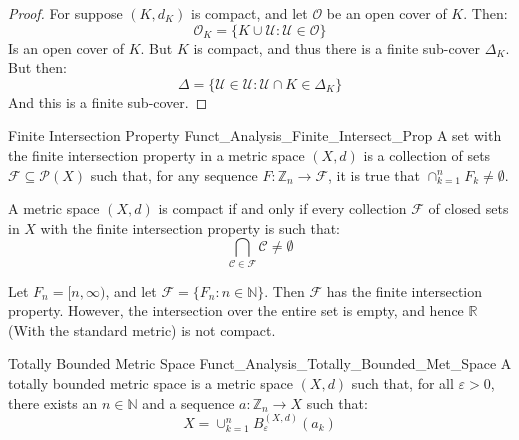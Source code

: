        \begin{proof}
            For suppose $(K,d_{K})$ is compact, and let
            $\mathcal{O}$ be an open cover of $K$. Then:
            \begin{equation}
                \mathcal{O}_{K}=\{K\cup\mathcal{U}:
                    \mathcal{U}\in\mathcal{O}\}
            \end{equation}
            Is an open cover of $K$. But $K$ is compact,
            and thus there is a finite sub-cover
            $\Delta_{K}$. But then:
            \begin{equation}
                \Delta=\{\mathcal{U}\in\mathcal{U}:
                         \mathcal{U}\cap{K}\in\Delta_{K}\}
            \end{equation}
            And this is a finite sub-cover.
        \end{proof}
        \begin{ldefinition}{Finite Intersection Property}
              {Funct_Analysis_Finite_Intersect_Prop}
            A set with the finite intersection property
            in a metric space $(X,d)$ is a collection of sets
            $\mathscr{F}\subseteq\mathcal{P}(X)$ such that,
            for any sequence
            $F:\mathbb{Z}_{n}\rightarrow\mathscr{F}$,
            it is true that $\cap_{k=1}^{n}F_{k}\ne\emptyset$.
        \end{ldefinition}
        \begin{theorem}
            A metric space $(X,d)$ is compact if and only if
            every collection $\mathscr{F}$ of closed sets in
            $X$ with the
            finite intersection property is such that:
            \begin{equation}
                \bigcap_{\mathcal{C}\in\mathcal{F}}
                    \mathcal{C}\ne\emptyset
            \end{equation}
        \end{theorem}
        \begin{lexample}
            Let $F_{n}=[n,\infty)$, and let
            $\mathscr{F}=\{F_{n}:n\in\mathbb{N}\}$.
            Then $\mathscr{F}$ has the finite intersection
            property. However, the intersection over the
            entire set is empty, and hence $\mathbb{R}$
            (With the standard metric) is not compact.
        \end{lexample}
        \begin{ldefinition}{Totally Bounded Metric Space}
              {Funct_Analysis_Totally_Bounded_Met_Space}
            A totally bounded metric space is a metric
            space $(X,d)$ such that, for all $\varepsilon>0$,
            there exists an $n\in\mathbb{N}$ and a sequence
            $a:\mathbb{Z}_{n}\rightarrow{X}$ such that:
            \begin{equation}
                X=\cup_{k=1}^{n}B_{\varepsilon}^{(X,d)}(a_{k})
            \end{equation}
        \end{ldefinition}
